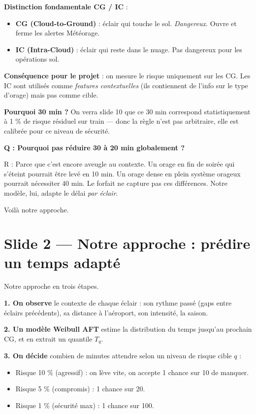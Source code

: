 \documentclass[11pt,a4paper]{article}
\begin{document}
\begin{compr}
\textbf{Distinction fondamentale CG / IC} :
\begin{itemize}
    \item \textbf{CG (Cloud-to-Ground)} : éclair qui touche le sol. \emph{Dangereux}. Ouvre
    et ferme les alertes Météorage.
    \item \textbf{IC (Intra-Cloud)} : éclair qui reste dans le nuage. Pas dangereux pour
    les opérations sol.
\end{itemize}

\textbf{Conséquence pour le projet} : on mesure le risque uniquement sur les CG. Les IC sont
utilisés comme \emph{features contextuelles} (ils contiennent de l'info sur le type d'orage)
mais pas comme cible.

\textbf{Pourquoi 30 min ?} On verra slide 10 que ce 30 min correspond statistiquement à
1 \% de risque résiduel sur train — donc la règle n'est pas arbitraire, elle est calibrée
pour ce niveau de sécurité.
\end{compr}

\begin{piege}
\textbf{Q : Pourquoi pas réduire 30 à 20 min globalement ?}

R : Parce que c'est encore aveugle au contexte. Un orage en fin de soirée qui s'éteint
pourrait être levé en 10 min. Un orage dense en plein système orageux pourrait nécessiter
40 min. Le forfait ne capture pas ces différences. Notre modèle, lui, adapte le délai
\emph{par éclair}.
\end{piege}

\begin{transit}
\og Voilà notre approche. \fg{}
\end{transit}

\section{Slide 2 — Notre approche : prédire un temps adapté}

\begin{dire}
\og Notre approche en trois étapes.

\textbf{1. On observe} le contexte de chaque éclair : son rythme passé (gaps entre éclairs
précédents), sa distance à l'aéroport, son intensité, la saison.

\textbf{2. Un modèle Weibull AFT} estime la distribution du temps jusqu'au prochain CG, et
en extrait un quantile $T_q$.

\textbf{3. On décide} combien de minutes attendre selon un niveau de risque cible $q$ :
\begin{itemize}
    \item Risque 10 \% (agressif) : on lève vite, on accepte 1 chance sur 10 de manquer.
    \item Risque 5 \% (compromis) : 1 chance sur 20.
    \item Risque 1 \% (sécurité max) : 1 chance sur 100.
\end{itemize}
\fg{}
\end{dire}
\end{document}
